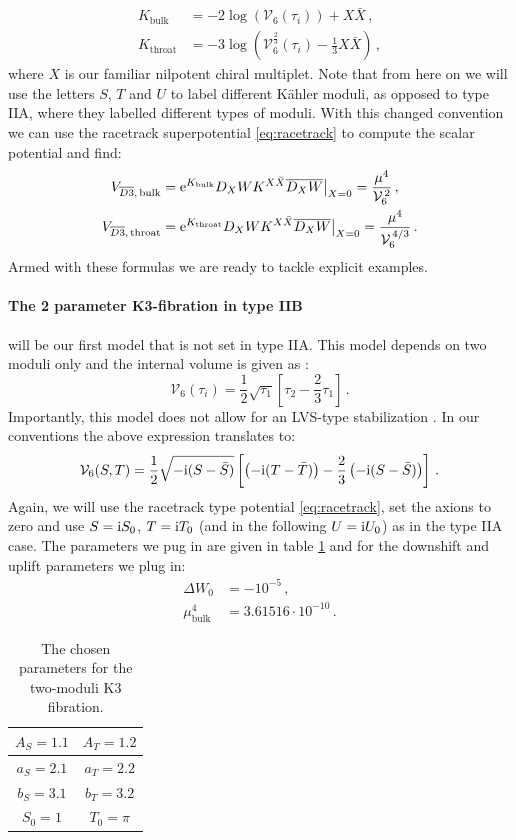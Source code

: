 \documentclass[a4paper,12pt,twoside,openright]{report}
\newcommand{\be}{\begin{equation}}
\newcommand{\ee}{\end{equation}}
\newcommand{\bea}{\begin{equation}\begin{aligned}}
\newcommand{\eea}{\end{aligned}\end{equation}}
\def\rmi{{\rm i}}
\def\rme{{\rm e}}
\begin{document}
\bea
K_{\text{bulk}} &= -2 \log \left( \mathcal{V}_6 (\tau_i)\right) + X\bar{X}\,,\\
K_{\text{throat}} &= -3 \log \left( \mathcal{V}^ {\frac{2}{3}}_6 (\tau_i) - \frac{1}{3} X\bar{X}\right)\,,
\eea
where $X$ is our familiar nilpotent chiral multiplet. Note that from here on we will use the letters $S$, $T$ and $U$ to label different Kähler moduli, as opposed to type IIA, where they labelled different types of moduli. With this changed convention we can use the racetrack superpotential \eqref{eq:racetrack} to compute the scalar potential and find:
\bea 
V_{\overline{D3},\,\text{bulk}} &= \rme^{K_{\text{bulk}}} D_X W K^{X\bar{X}} \overline{D_X W}\big|_{X=0} = \frac{\mu^4}{\mathcal{V}_6^{\,2}}\,,\\
V_{\overline{D3},\,\text{throat}} &=  \rme^{K_{\text{throat}}} D_X W K^{X\bar{X}} \overline{D_X W}\big|_{X=0} = \frac{\mu^4}{\mathcal{V}_6^{\,4/3}}\,.
\eea
Armed with these formulas we are ready to tackle explicit examples.


\paragraph{The 2 parameter K3-fibration in type IIB} will be our first model that is not set in type IIA. This model depends on two moduli only and the internal volume is given as \cite{Cicoli:2008va}:
\be 
\mathcal{V}_6 (\tau_i) = \frac{1}{2} \sqrt{\tau_1} \left[\tau_2 - \frac{2}{3} \tau_1 \right]\,.
\ee
Importantly, this model does not allow for an LVS-type stabilization \cite{Balasubramanian:2005zx}. In our conventions the above expression translates to:
\be 
\mathcal{V}_6(S,T) = \frac{1}{2} \sqrt{-\rmi (S-\bar{S})} \left[ \left( -\rmi (T-\bar{T}) \right) - \frac{2}{3} \left( -\rmi (S-\bar{S})\right) \right]\,.
\ee
Again, we will use the racetrack type potential \eqref{eq:racetrack}, set the axions to zero and use $S=\rmi S_0$, $T=\rmi T_0$ (and in the following $U=\rmi U_0$) as in the type IIA case. The parameters we pug in are given in table \ref{tab:2modK3para} and for the downshift and uplift parameters we plug in:
\bea 
\Delta W_0 &= -10^{-5}\,,\\
\mu_{\text{bulk}}^4 &= 3.61516 \cdot 10^{-10}\,.
\eea
\begin{table}[htb]
\centering
\begin{tabular}{|c|c|}\hline
$A_S = 1.1$ & $A_T = 1.2$ \\\hline
$a_S = 2.1$ & $a_T = 2.2$ \\\hline
$b_S = 3.1$ & $b_T = 3.2$ \\\hline
$S_0 = 1$ & $T_0 = \pi$ \\\hline
\end{tabular}
\caption{ The chosen parameters for the two-moduli K3 fibration.}
\label{tab:2modK3para}
\end{table}
\end{document}
